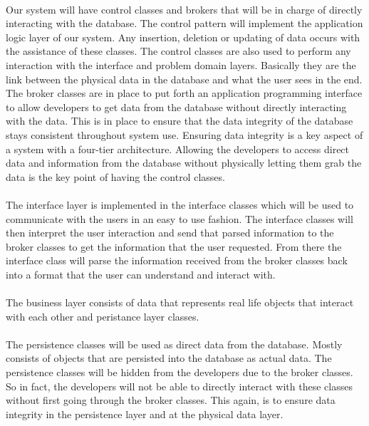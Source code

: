 \documentclass[letterpaper,12pt]{report}
\begin{document}
\paragraph*{}\hspace{0.6cm}Our system will have control classes and brokers that will be in charge of directly interacting with the database. The control pattern will implement the application logic layer of our system. Any insertion, deletion or updating of data occurs with the assistance of these classes. The control classes are also used to perform any interaction with the interface and problem domain layers. Basically they are the link between the physical data in the database and what the user sees in the end. The broker classes are in place to put forth an application programming interface to allow developers to get data from the database without directly interacting with the data. This is in place to ensure that the data integrity of the database stays consistent throughout system use. Ensuring data integrity is a key aspect of a system with a four-tier architecture. Allowing the developers to access direct data and information from the database without physically letting them grab the data is the key point of having the control classes.\newline
\paragraph*{}\hspace{0.6cm}The interface layer is implemented in the interface classes which will be used to communicate with the users in an easy to use fashion. The interface classes will then interpret the user interaction and send that parsed information to the broker classes to get the information that the user requested. From there the interface class will parse the information received from the broker classes back into a format that the user can understand and interact with.\newline
\paragraph*{}\hspace{0.6cm}The business layer consists of data that represents real life objects that interact with each other and peristance layer classes.
\paragraph*{}\hspace{0.6cm}The persistence classes will be used as direct data from the database. Mostly consists of objects that are persisted into the database as actual data. The persistence classes will be hidden from the developers due to the broker classes. So in fact, the developers will not be able to directly interact with these classes without first going through the broker classes. This again, is to ensure data integrity in the persistence layer and at the physical data layer.
\end{document}
